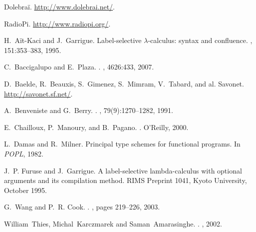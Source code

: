 \documentclass[twoside]{article}
\theoremstyle{plain}
\theoremstyle{definition}
\theoremstyle{remark}
\begin{document}

\begin{thebibliography}{10}

Dolebra\"i.
\newblock \url{http://www.dolebrai.net/}.

{RadioPi}.
\newblock \url{http://www.radiopi.org/}.

H.~A\"it-Kaci and J.~Garrigue.
\newblock Label-selective $\lambda$-calculus: syntax and confluence.
, 151:353--383, 1995.

C.~Baccigalupo and E.~Plaza.
.
, 4626:433, 2007.

D.~Baelde, R.~Beauxis, S.~Gimenez, S.~Mimram, V.~Tabard, and al.
\newblock Savonet.
\newblock \hbox{\url{http://savonet.sf.net/}}.

A.~Benveniste and G.~Berry.
.
, 79(9):1270--1282, 1991.

E.~Chailloux, P.~Manoury, and B.~Pagano.
.
\newblock O'Reilly, 2000.

L.~Damas and R.~Milner.
\newblock Principal type schemes for functional programs.
\newblock In {\em POPL}, 1982.

J.~P. Furuse and J.~Garrigue.
\newblock A label-selective lambda-calculus with optional arguments and its
  compilation method.
\newblock RIMS Preprint 1041, Kyoto University, October 1995.


G.~Wang and P.~R. Cook.
.
, pages
  219--226, 2003.

William~Thies, Michal~Karczmarek and Saman~Amarasinghe.
.
, 2002.

\end{thebibliography}
\end{document}
